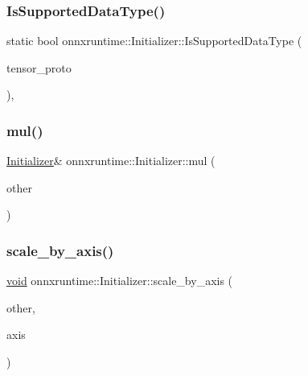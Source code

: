 \mbox{\label{classonnxruntime_1_1Initializer_a23b182168184a54bfd33279aade5449c}} 
\subsubsection{\texorpdfstring{Is\+Supported\+Data\+Type()}{IsSupportedDataType()}}
{\footnotesize\ttfamily static bool onnxruntime\+::\+Initializer\+::\+Is\+Supported\+Data\+Type (\begin{DoxyParamCaption}\item[{const O\+N\+N\+X\+\_\+\+N\+A\+M\+E\+S\+P\+A\+C\+E\+::\+Tensor\+Proto $\ast$}]{tensor\+\_\+proto }\end{DoxyParamCaption})\hspace{0.3cm}{\ttfamily [inline]}, {\ttfamily [static]}}

\mbox{\label{classonnxruntime_1_1Initializer_a5a782f94351a5873490294817ff9ee04}} 
\subsubsection{\texorpdfstring{mul()}{mul()}}
{\footnotesize\ttfamily \mbox{\hyperlink{classonnxruntime_1_1Initializer}{Initializer}}\& onnxruntime\+::\+Initializer\+::mul (\begin{DoxyParamCaption}\item[{const \mbox{\hyperlink{classonnxruntime_1_1Initializer}{Initializer}} \&}]{other }\end{DoxyParamCaption})\hspace{0.3cm}{\ttfamily [inline]}}

\mbox{\label{classonnxruntime_1_1Initializer_aa0e2a74cecda48ca39fe9e757bcd5c5e}} 
\subsubsection{\texorpdfstring{scale\+\_\+by\+\_\+axis()}{scale\_by\_axis()}}
{\footnotesize\ttfamily \mbox{\hyperlink{mlasi_8h_a88f941d423cb2a819b70a1358982b1a6}{void}} onnxruntime\+::\+Initializer\+::scale\+\_\+by\+\_\+axis (\begin{DoxyParamCaption}\item[{const \mbox{\hyperlink{classonnxruntime_1_1Initializer}{Initializer}} \&}]{other,  }\item[{int}]{axis }\end{DoxyParamCaption})\hspace{0.3cm}{\ttfamily [inline]}}

